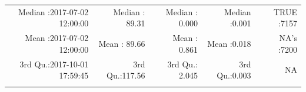 \documentclass[
  10pt,
  a4paper,oneside]{article}
\begin{document}
\begin{longtable}[]{@{}rrrrr@{}}
\begin{minipage}[t]{0.27\columnwidth}\raggedleft
Median :2017-07-02 12:00:00\strut
\end{minipage} & \begin{minipage}[t]{0.15\columnwidth}\raggedleft
Median : 89.31\strut
\end{minipage} & \begin{minipage}[t]{0.15\columnwidth}\raggedleft
Median : 0.000\strut
\end{minipage} & \begin{minipage}[t]{0.14\columnwidth}\raggedleft
Median :0.001\strut
\end{minipage} & \begin{minipage}[t]{0.14\columnwidth}\raggedleft
TRUE :7157\strut
\end{minipage}\tabularnewline
\begin{minipage}[t]{0.27\columnwidth}\raggedleft
Mean :2017-07-02 12:00:00\strut
\end{minipage} & \begin{minipage}[t]{0.15\columnwidth}\raggedleft
Mean : 89.66\strut
\end{minipage} & \begin{minipage}[t]{0.15\columnwidth}\raggedleft
Mean : 0.861\strut
\end{minipage} & \begin{minipage}[t]{0.14\columnwidth}\raggedleft
Mean :0.018\strut
\end{minipage} & \begin{minipage}[t]{0.14\columnwidth}\raggedleft
NA's :7200\strut
\end{minipage}\tabularnewline
\begin{minipage}[t]{0.27\columnwidth}\raggedleft
3rd Qu.:2017-10-01 17:59:45\strut
\end{minipage} & \begin{minipage}[t]{0.15\columnwidth}\raggedleft
3rd Qu.:117.56\strut
\end{minipage} & \begin{minipage}[t]{0.15\columnwidth}\raggedleft
3rd Qu.: 2.045\strut
\end{minipage} & \begin{minipage}[t]{0.14\columnwidth}\raggedleft
3rd Qu.:0.003\strut
\end{minipage} & \begin{minipage}[t]{0.14\columnwidth}\raggedleft
NA\strut
\end{minipage}\tabularnewline
\begin{minipage}[t]{0.27\columnwidth}\raggedleft

\end{minipage}
\end{longtable}
\end{document}
